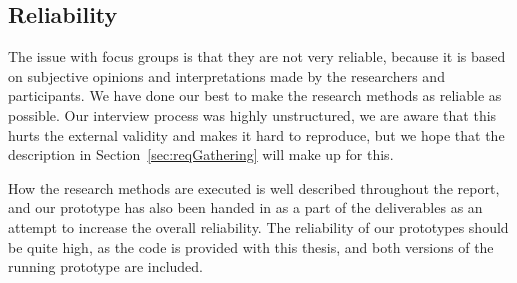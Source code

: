 \subsection{Reliability}
The issue with focus groups is that they are not very reliable, because it is based on subjective opinions and interpretations made by the researchers and participants. We have done our best to make the research methods as reliable as possible. Our interview process was highly unstructured, we are aware that this hurts the external validity and makes it hard to reproduce, but we hope that the description in Section~\ref{sec:reqGathering} will make up for this. 

How the research methods are executed is well described throughout the report, and our prototype has also been handed in as a part of the deliverables as an attempt to increase the overall reliability. The reliability of our prototypes should be quite high, as the code is provided with this thesis, and both versions of the running prototype are included.
